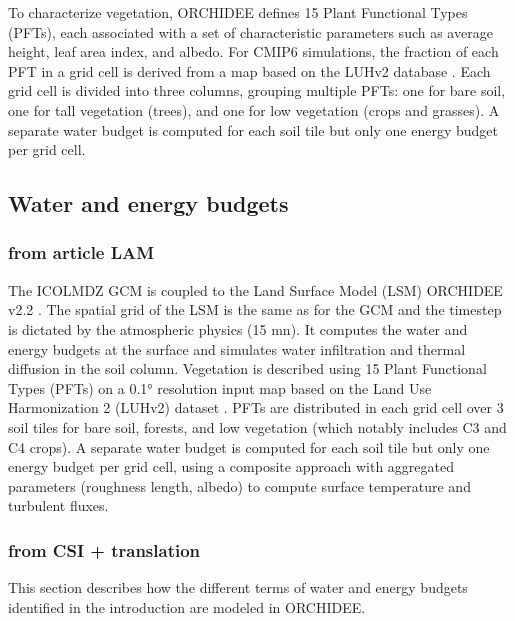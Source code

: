 To characterize vegetation, ORCHIDEE defines 15 Plant Functional Types (PFTs), each associated with a set of characteristic parameters such as average height, leaf area index, and albedo. For CMIP6 simulations, the fraction of each PFT in a grid cell is derived from a map based on the LUHv2 database \citep{lurton_implementation_2020}. Each grid cell is divided into three columns, grouping multiple PFTs: one for bare soil, one for tall vegetation (trees), and one for low vegetation (crops and grasses). A separate water budget is computed for each soil tile but only one energy budget per grid cell.

\subsection{Water and energy budgets}
\subsubsection{from article LAM}
The ICOLMDZ GCM is coupled to the Land Surface Model (LSM) ORCHIDEE v2.2 \citep{cheruy_improved_2020}. The spatial grid of the LSM is the same as for the GCM and the timestep is dictated by the atmospheric physics (15 mn).
It computes the water and energy budgets at the surface and simulates water infiltration and thermal diffusion in the soil column. 
Vegetation is described using 15 Plant Functional Types (PFTs) on a 0.1° resolution input map based on the Land Use Harmonization 2 (LUHv2) dataset \citep{hurtt_harmonization_2020, lurton_implementation_2020}. PFTs are distributed in each grid cell over 3 soil tiles for bare soil, forests, and low vegetation (which notably includes C3 and C4 crops).
A separate water budget is computed for each soil tile but only one energy budget per grid cell, using a composite approach with aggregated parameters (roughness length, albedo) to compute surface temperature and turbulent fluxes. 

\subsubsection{from CSI + translation}
This section describes how the different terms of water and energy budgets identified in the introduction are modeled in ORCHIDEE.  

